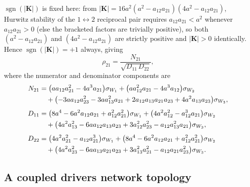 \documentclass{article}
\begin{document}
$\operatorname{sgn}(|\mathbf{K}|)$ is fixed here: from
$|\mathbf{K}|=16a^2(a^2-a_{12}a_{21})(4a^2-a_{12}a_{21})$, Hurwitz stability of the
$1\leftrightarrow2$ reciprocal pair requires $a_{12}a_{21}<a^2$ whenever $a_{12}a_{21}>0$
(else the bracketed factors are trivially positive), so both $(a^2-a_{12}a_{21})$ and
$(4a^2-a_{12}a_{21})$ are strictly positive and $|\mathbf{K}|>0$ identically. Hence
$\operatorname{sgn}(|\mathbf{K}|)=+1$ always, giving
\begin{equation}
\rho_{21} = \frac{N_{21}}{\sqrt{D_{11}\,D_{22}}},
\label{eq:rho21_moderator}
\end{equation}
where the numerator and denominator components are
\begin{align}
N_{21} &= \bigl(aa_{12}a_{21}^2-4a^3a_{21}\bigr)\sigma_{W_1} + \bigl(aa_{12}^2a_{21}-4a^3a_{12}\bigr)\sigma_{W_2} \notag\\
&\quad+ \bigl(-3aa_{12}a_{23}^2-3aa_{13}^2a_{21}+2a_{12}a_{13}a_{21}a_{23}+4a^2a_{13}a_{23}\bigr)\sigma_{W_3},
\label{eq:N21_moderator}\\[4pt]
D_{11} &= \bigl(8a^4-6a^2a_{12}a_{21}+a_{12}^2a_{21}^2\bigr)\sigma_{W_1} + \bigl(4a^2a_{12}^2-a_{12}^3a_{21}\bigr)\sigma_{W_2} \notag\\
&\quad+ \bigl(4a^2a_{13}^2-6aa_{12}a_{13}a_{23}+3a_{12}^2a_{23}^2-a_{12}a_{13}^2a_{21}\bigr)\sigma_{W_3},
\label{eq:D11_moderator}\\[4pt]
D_{22} &= \bigl(4a^2a_{21}^2-a_{12}a_{21}^3\bigr)\sigma_{W_1} + \bigl(8a^4-6a^2a_{12}a_{21}+a_{12}^2a_{21}^2\bigr)\sigma_{W_2} \notag\\
&\quad+ \bigl(4a^2a_{23}^2-6aa_{13}a_{21}a_{23}+3a_{13}^2a_{21}^2-a_{12}a_{21}a_{23}^2\bigr)\sigma_{W_3}.
\label{eq:D22_moderator}
\end{align}

\subsection*{A coupled drivers network topology}
\end{document}

